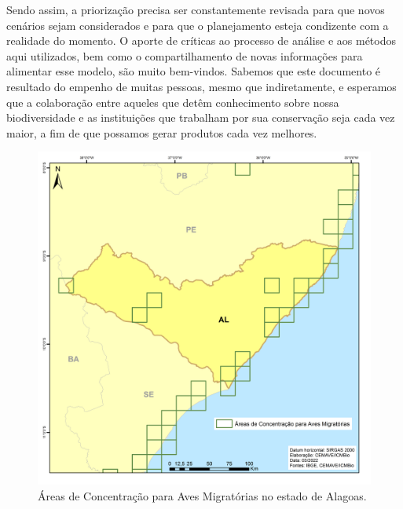 \documentclass[
  oneside]{scrbook}
\begin{document}
Sendo assim, a priorização precisa ser constantemente revisada para que novos cenários sejam considerados e para que o planejamento esteja condizente com a realidade do momento. O aporte de críticas ao processo de análise e aos métodos aqui utilizados, bem como o compartilhamento de novas informações para alimentar esse modelo, são muito bem-vindos. Sabemos que este documento é resultado do empenho de muitas pessoas, mesmo que indiretamente, e esperamos que a colaboração entre aqueles que detêm conhecimento sobre nossa biodiversidade e as instituições que trabalham por sua conservação seja cada vez maior, a fim de que possamos gerar produtos cada vez melhores.

\begin{figure}[H]

{\centering \includegraphics[width=0.75\linewidth]{imagens/cap07/Figura_7.11_AL} 

}

\caption{Áreas de Concentração para Aves Migratórias no estado de Alagoas.}\label{fig:31}
\end{figure}
\end{document}

